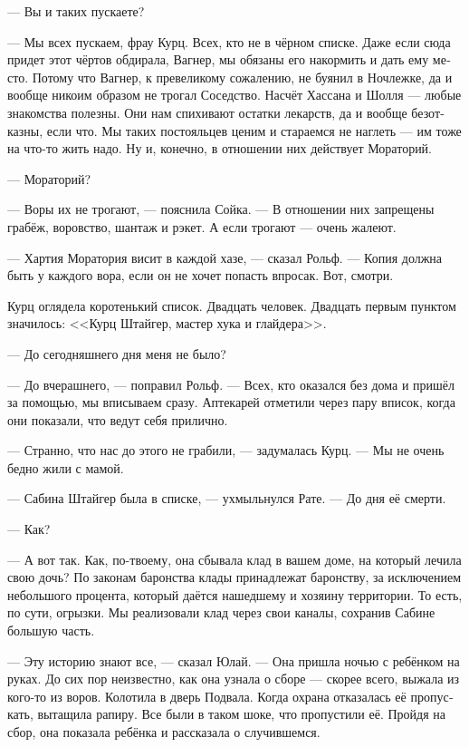 \documentclass[a4paper,12pt,fleqn]{book}\usepackage{cooltooltips}\usepackage{polyglossia}\setdefaultlanguage[babelshorthands=true]{russian}\setotherlanguage{english}\defaultfontfeatures{Ligatures=TeX,Mapping=tex-text} \usepackage{xcolor}\definecolor{lightgray}{HTML}{bbbbbb}\color{lightgray}\newcommand{\ml}[3]{\textenglish{\textcolor{black}{#3}}}
\begin{document}
--- Вы и таких пускаете?

--- Мы всех пускаем, фрау Курц.
Всех, кто не в чёрном списке.
Даже если сюда придет этот чёртов обдирала, Вагнер, мы обязаны его накормить и дать ему место.
Потому что Вагнер, к превеликому сожалению, не буянил в Ночлежке, да и вообще никоим образом не трогал Соседство.
Насчёт Хассана и Шолля --- любые знакомства полезны. 
Они нам спихивают остатки лекарств, да и вообще безотказны, если что.
Мы таких постояльцев ценим и стараемся не наглеть --- им тоже на что-то жить надо.
Ну и, конечно, в отношении них действует Мораторий.

--- Мораторий?

--- Воры их не трогают, --- пояснила Сойка.
--- В отношении них запрещены грабёж, воровство, шантаж и рэкет.
А если трогают --- очень жалеют.

--- Хартия Моратория висит в каждой хазе, --- сказал Рольф.
--- Копия должна быть у каждого вора, если он не хочет попасть впросак.
Вот, смотри.

Курц оглядела коротенький список.
Двадцать человек.
Двадцать первым пунктом значилось: <<Курц Штайгер, мастер хука и глайдера>>.

--- До сегодняшнего дня меня не было?

--- До вчерашнего, --- поправил Рольф.
--- Всех, кто оказался без дома и пришёл за помощью, мы вписываем сразу.
Аптекарей отметили через пару вписок, когда они показали, что ведут себя прилично.

--- Странно, что нас до этого не грабили, --- задумалась Курц.
--- Мы не очень бедно жили с мамой.

--- Сабина Штайгер была в списке, --- ухмыльнулся Рате.
--- До дня её смерти.

--- Как?

--- А вот так.
Как, по-твоему, она сбывала клад в вашем доме, на который лечила свою дочь?
По законам баронства клады принадлежат баронству, за исключением небольшого процента, который даётся нашедшему и хозяину территории.
То есть, по сути, огрызки.
Мы реализовали клад через свои каналы, сохранив Сабине большую часть.

--- Эту историю знают все, --- сказал Юлай.
--- Она пришла ночью с ребёнком на руках.
До сих пор неизвестно, как она узнала о сборе --- скорее всего, выжала из кого-то из воров.
Колотила в дверь Подвала.
Когда охрана отказалась её пропускать, вытащила рапиру.
Все были в таком шоке, что пропустили её.
Пройдя на сбор, она показала ребёнка и рассказала о случившемся.
\end{document}
